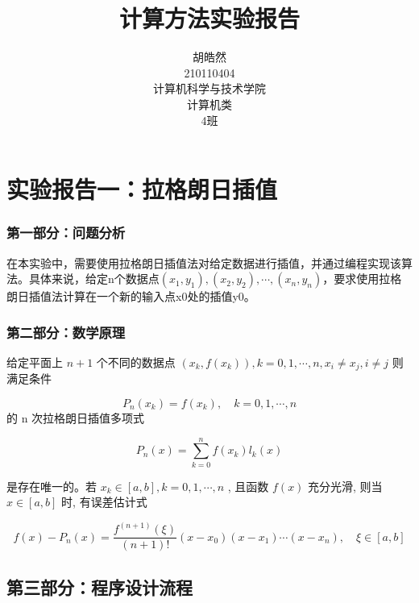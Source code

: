 \documentclass[a4paper,zihao=4,UTF8]{ctexart}
\title{\textbf{计算方法实验报告}}
\author{胡皓然\\
210110404\\
计算机科学与技术学院\\
计算机类\\
4班\\
}
\date{}
\begin{document}
\maketitle


\newpage

\section*{ \textbf{实验报告一：拉格朗日插值}}

\subsubsection*{第一部分：问题分析}

在本实验中，需要使用拉格朗日插值法对给定数据进行插值，并通过编程实现该算法。具体来说，给定n个数据点$(x_1,y_1),(x_2,y_2), \cdots, (x_n,y_n)$，要求使用拉格朗日插值法计算在一个新的输入点x0处的插值y0。

\subsubsection*{第二部分：数学原理}

给定平面上  $n+1 $ 个不同的数据点  $\left(x_k,f\left(x_k\right)\right),k=0,1,\cdots,n,x_i\neq x_j,i\neq j$
则满足条件

$$P_{n}\left(x_{k}\right)=f\left(x_{k}\right), \quad k=0,1, \cdots, n$$
的 n 次拉格朗日插值多项式

$$P_{n}(x)=\sum_{k=0}^{n} f\left(x_{k}\right) l_{k}(x)$$

是存在唯一的。若 $ x_{k} \in[a, b], k=0,1, \cdots, n$ , 且函数  $f(x)$  充分光滑, 则当  $x \in[a, b]$  时, 有误差估计式

$$f(x)-P_{n}(x)=\frac{f^{(n+1)}(\xi)}{(n+1) !}\left(x-x_{0}\right)\left(x-x_{1}\right) \cdots\left(x-x_{n}\right), \quad \xi \in[a, b]$$


\subsection*{第三部分：程序设计流程}
\end{document}
